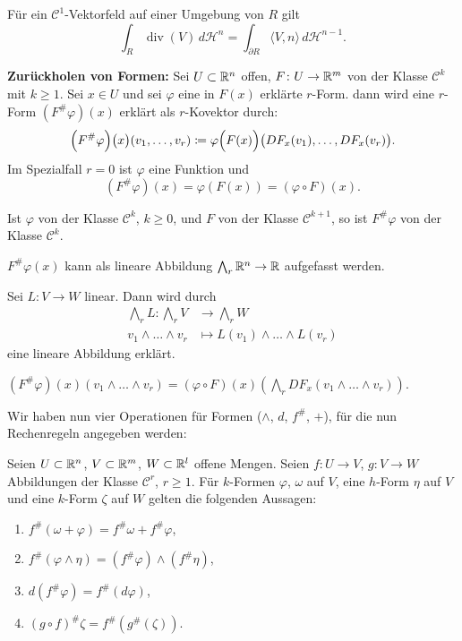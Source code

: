 \documentclass[a4paper,twoside,DIV15,BCOR12mm]{scrbook}
\newcommand{\HM}{\mathscr H}
\newcommand{\bw}{\bigwedge\nolimits}
\DeclareMathOperator{\Div}{div}
\begin{document}
\begin{korollar}
Für ein $\mathcal C^1$-Vektorfeld auf einer Umgebung von $R$ gilt
\[
\int_R \Div(V)\, d\HM^n = \int_{\partial R} \langle V, n\rangle \, d\HM^{n-1}.
\]
\end{korollar}

\textbf{Zurückholen von Formen:}
Sei $U\subset\mathbb{R}^n$ offen, $F\colon U\to \mathbb{R}^m$ von der Klasse $\mathcal C^k$ mit $k\ge 1$. Sei $x\in U$ und sei $\varphi$ eine in $F(x)$ erklärte $r$-Form. dann wird eine $r$-Form $(F^\#\varphi)(x)$ erklärt als $r$-Kovektor durch:
\[
\Big(F^\#\varphi\Big)\big(x\big)(v_1,\ldots,v_r) \da \varphi\Big(F(x)\Big)\big(DF_x(v_1),\ldots,DF_x(v_r)\big).
\]
Im Spezialfall $r=0$ ist $\varphi$ eine Funktion und
\[
(F^\#\varphi)(x) = \varphi(F(x)) = (\varphi\circ F)(x).
\]

\begin{bemerkungen}
\item Ist $\varphi$ von der Klasse $\mathcal C^k$, $k\ge 0$, und $F$ von der Klasse $\mathcal C^{k+1}$, so ist $F^\#\varphi$ von der Klasse $\mathcal C^k$.
\item $F^\#\varphi(x)$ kann als lineare Abbildung $\bw_r\MdR^n\to \MdR$ aufgefasst werden.
\item Sei $L\colon V\to W$ linear. Dann wird durch
\begin{align*}
\bw_rL \colon \bw_r V &\to \bw_r W \\
v_1\wedge\dots\wedge v_r &\mapsto L(v_1)\wedge \dots \wedge L(v_r)
\end{align*}
eine lineare Abbildung erklärt.
\item $(F^\# \varphi)(x)(v_1\wedge\dots\wedge v_r) = (\varphi\circ F)(x)(\bw_r DF_x(v_1\wedge \dots\wedge v_r))$.
\end{bemerkungen}

\pagebreak[3]
Wir haben nun vier Operationen für Formen ($\wedge$, $d$, $f^\#$, $+$), für die nun Rechenregeln angegeben werden:
\begin{lemma}
\label{lem:4.5}
Seien $U\subset \mathbb{R}^n$, $V\subset\mathbb{R}^m$, $W\subset\mathbb{R}^l$ offene Mengen. Seien $f\colon U\to V$, $g\colon V\to W$ Abbildungen der Klasse $\mathcal C^r$, $r\ge 1$.
Für $k$-Formen $\varphi$, $\omega$ auf $V$, eine $h$-Form $\eta$  auf $V$ und eine $k$-Form $\zeta$ auf $W$ gelten die folgenden Aussagen:
\begin{enumerate}
\item $f^\#(\omega + \varphi) = f^\# \omega + f^\# \varphi$,
\item $f^\#(\varphi \wedge \eta) = (f^\# \varphi) \wedge (f^\# \eta)$,
\item $d(f^\# \varphi) = f^\#(d\varphi)$,
\item $(g\circ f)^\#\zeta = f^\#(g^\#(\zeta))$.
\end{enumerate}
\end{lemma}
\end{document}
